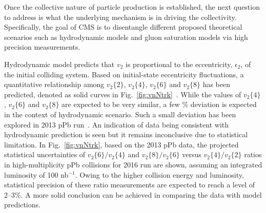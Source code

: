 Once the collective nature of particle production is established, 
the next question to address is what the underlying mechanism is in 
driving the collectivity. Specifically, the goal of CMS is to 
disentangle different proposed theoretical scenarios such as hydrodynamic models and
gluon saturation models via high precision measurements. 

Hydrodynamic model predicts that $v_2$ is proportional to the 
eccentricity, $\epsilon_{2}$, of the initial colliding system.
Based on initial-state eccentricity fluctuations, a quantitative
relationship among $v_2\{2\}$, $v_2\{4\}$, $v_2\{6\}$ and $v_2\{8\}$ 
has been predicted, denoted as solid curves in Fig.~\ref{fig:vnNtrk}~\cite{Yan:2013laa}. 
While the values of $v_2\{4\}$, $v_2\{6\}$ and $v_2\{8\}$
are expected to be very similar, a few \% deviation is expected in the context of
hydrodynamic scenario. Such a small deviation has been explored in 2013 
pPb run~\cite{Khachatryan:2015waa}. An indication of data being consistent 
with hydrodynamic prediction is seen but it remains inconclusive due to 
statistical limitation. In Fig.~\ref{fig:vnNtrk}, based on the 2013 pPb data, the projected statistical
uncertainties of $v_2\{6\}/v_2\{4\}$ and $v_2\{8\}/v_2\{6\}$ versus
$v_2\{4\}/v_2\{2\}$ ratios in high-multiplicity pPb collisions for 2016 run
are shown, assuming an integrated luminosity of 100 nb$^{-1}$.
Owing to the higher collision energy and luminosity, statistical precision 
of these ratio measurements are expected to reach a level of 2--3\%.
A more solid conclusion can be achieved in comparing the data with model predictions.

\clearpage